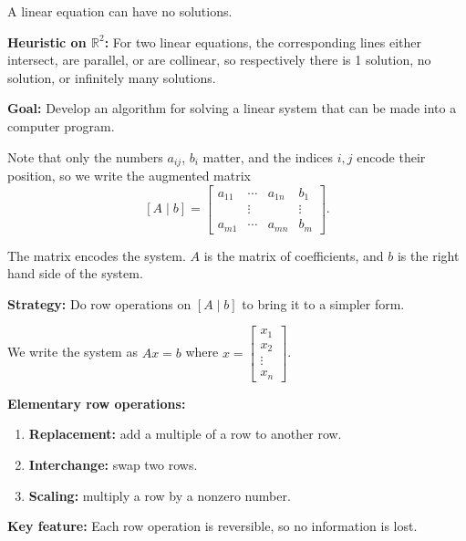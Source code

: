 \documentclass{article}
\begin{document}
\medskip

A linear equation can have no solutions.

\medskip

\textbf{Heuristic on $\mathbb{R}^2$:} For two linear equations, the corresponding lines either intersect, are parallel, or are collinear, so respectively there is 1 solution, no solution, or infinitely many solutions.

\medskip

\textbf{Goal:} Develop an algorithm for solving a linear system that can be made into a computer program.

\bigskip

Note that only the numbers $a_{ij}$, $b_i$ matter, and the indices $i, j$ encode their position, so we write the augmented matrix
\[
[A \mid b] =
\left[
\begin{array}{ccc|c}
a_{11} & \cdots & a_{1n} & b_1 \\
& \vdots & & \vdots \\
a_{m1} & \cdots & a_{mn} & b_m
\end{array}
\right].
\]

The matrix encodes the system. $A$ is the matrix of coefficients, and $b$ is the right hand side of the system.

\medskip

\textbf{Strategy:} Do row operations on $[A \mid b]$ to bring it to a simpler form.

\medskip

We write the system as $Ax = b$ where $x = \begin{bmatrix} x_1 \\ x_2 \\ \vdots \\ x_n \end{bmatrix}$.

\bigskip

\textbf{Elementary row operations:}
\begin{enumerate}
\item \textbf{Replacement:} add a multiple of a row to another row.
\item \textbf{Interchange:} swap two rows.
\item \textbf{Scaling:} multiply a row by a nonzero number.
\end{enumerate}

\medskip

\textbf{Key feature:} Each row operation is reversible, so no information is lost.
\end{document}
